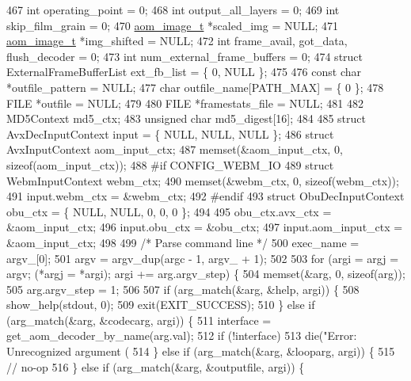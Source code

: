 \begin{DoxyCodeInclude}
{{{{{{{{{{{{{{{{{{{{{{{{{467   \textcolor{keywordtype}{int} operating\_point = 0;
468   \textcolor{keywordtype}{int} output\_all\_layers = 0;
469   \textcolor{keywordtype}{int} skip\_film\_grain = 0;
470   \hyperlink{structaom__image}{aom\_image\_t} *scaled\_img = NULL;
471   \hyperlink{structaom__image}{aom\_image\_t} *img\_shifted = NULL;
472   \textcolor{keywordtype}{int} frame\_avail, got\_data, flush\_decoder = 0;
473   \textcolor{keywordtype}{int} num\_external\_frame\_buffers = 0;
474   \textcolor{keyword}{struct }ExternalFrameBufferList ext\_fb\_list = \{ 0, NULL \};
475 
476   \textcolor{keyword}{const} \textcolor{keywordtype}{char} *outfile\_pattern = NULL;
477   \textcolor{keywordtype}{char} outfile\_name[PATH\_MAX] = \{ 0 \};
478   FILE *outfile = NULL;
479 
480   FILE *framestats\_file = NULL;
481 
482   MD5Context md5\_ctx;
483   \textcolor{keywordtype}{unsigned} \textcolor{keywordtype}{char} md5\_digest[16];
484 
485   \textcolor{keyword}{struct }AvxDecInputContext input = \{ NULL, NULL, NULL \};
486   \textcolor{keyword}{struct }AvxInputContext aom\_input\_ctx;
487   memset(&aom\_input\_ctx, 0, \textcolor{keyword}{sizeof}(aom\_input\_ctx));
488 \textcolor{preprocessor}{#if CONFIG\_WEBM\_IO}
489   \textcolor{keyword}{struct }WebmInputContext webm\_ctx;
490   memset(&webm\_ctx, 0, \textcolor{keyword}{sizeof}(webm\_ctx));
491   input.webm\_ctx = &webm\_ctx;
492 \textcolor{preprocessor}{#endif}
493   \textcolor{keyword}{struct }ObuDecInputContext obu\_ctx = \{ NULL, NULL, 0, 0, 0 \};
494 
495   obu\_ctx.avx\_ctx = &aom\_input\_ctx;
496   input.obu\_ctx = &obu\_ctx;
497   input.aom\_input\_ctx = &aom\_input\_ctx;
498 
499   \textcolor{comment}{/* Parse command line */}
500   exec\_name = argv\_[0];
501   argv = argv\_dup(argc - 1, argv\_ + 1);
502 
503   \textcolor{keywordflow}{for} (argi = argj = argv; (*argj = *argi); argi += arg.argv\_step) \{
504     memset(&arg, 0, \textcolor{keyword}{sizeof}(arg));
505     arg.argv\_step = 1;
506 
507     \textcolor{keywordflow}{if} (arg\_match(&arg, &help, argi)) \{
508       show\_help(stdout, 0);
509       exit(EXIT\_SUCCESS);
510     \} \textcolor{keywordflow}{else} \textcolor{keywordflow}{if} (arg\_match(&arg, &codecarg, argi)) \{
511       \textcolor{keyword}{interface }= get\_aom\_decoder\_by\_name(arg.val);
512       \textcolor{keywordflow}{if} (!interface)
513         die(\textcolor{stringliteral}{"Error: Unrecognized argument (%
514     \} \textcolor{keywordflow}{else} \textcolor{keywordflow}{if} (arg\_match(&arg, &looparg, argi)) \{
515       \textcolor{comment}{// no-op}
516     \} \textcolor{keywordflow}{else} \textcolor{keywordflow}{if} (arg\_match(&arg, &outputfile, argi)) \{
}}}}}}}}}}}}}}}}}}}}}}}}}}
\end{DoxyCodeInclude}
